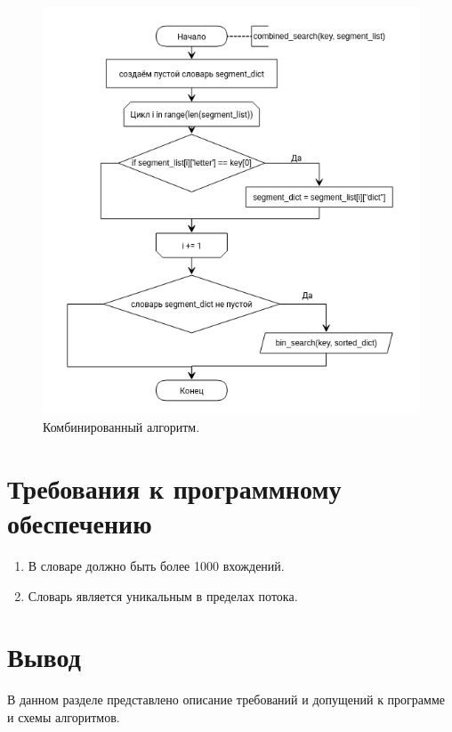 \documentclass[12pt]{report}
\begin{document}
\begin{figure}[h]
	\begin{center}
		\includegraphics[scale=0.9]{combine.png}
		\caption{Комбинированный алгоритм.}
		\label{fig:combi}
	\end{center}
\end{figure}

\clearpage
\newpage

\section{Требования к программному обеспечению}

\begin{enumerate}
	\item В словаре должно быть более 1000 вхождений.
	
	\item Словарь является уникальным в пределах потока.
	
\end{enumerate}


\section{Вывод}
	В данном разделе представлено описание требований и допущений к программе и схемы алгоритмов.
\end{document}
